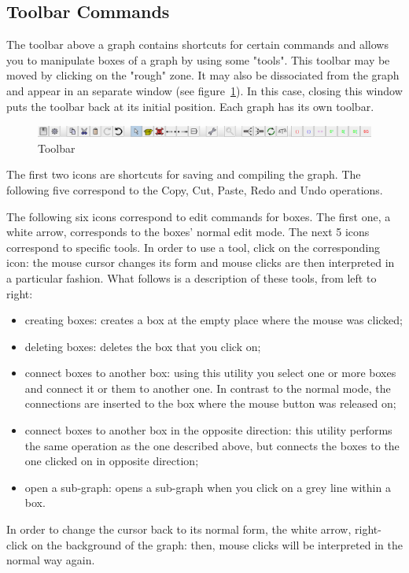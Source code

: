 \subsection{Toolbar Commands}
\label{toolbar-commands}

The toolbar above a graph contains shortcuts for certain commands
and allows you to manipulate boxes of a graph by using some "tools". This
toolbar may be moved by clicking on the "rough" zone. It may also be dissociated
from the graph and appear in an separate window (see
figure~\ref{fig-toolbar}). In this case, closing this window puts
the toolbar back at its initial position. Each graph has its own toolbar.

\begin{figure}[!ht]
\begin{center}
\includegraphics[width=15cm]{resources/img/fig5-20.png}
\caption{Toolbar\label{fig-toolbar}}
\end{center}
\end{figure}

\medskip
{}
\noindent The first two icons are shortcuts for saving and compiling the graph.
The following five correspond to the Copy, Cut, Paste, Redo and Undo operations. 

\bigskip
\noindent The following six icons correspond to edit commands for boxes. The first
one, a white arrow, corresponds to the boxes' normal edit mode. The next 5 icons
correspond to specific tools. In order to use a tool, click on the
corresponding icon: the mouse cursor changes its form and mouse clicks are then
interpreted in a particular fashion. What follows is a description of these
tools, from left to right:

\begin{itemize}
  \item creating boxes: creates a box at the empty place where the mouse was clicked;
  \item deleting boxes: deletes the box that you click on;
  \item connect boxes to another box: using this utility you select one or
  more boxes and connect it or them to another one. In contrast to the
  normal mode, the connections are inserted to the box where the mouse button
  was released on;
  \item connect boxes to another box in the opposite direction: this utility
  performs the same operation as the one described above, but connects the boxes
  to the one clicked on in opposite direction;
  \item open a sub-graph: opens a sub-graph when you click on a grey line within a box.
\end{itemize}
In order to change the cursor back to its normal form, the white arrow, right-click on the background of the graph:
then, mouse clicks will be interpreted in the normal way again.

